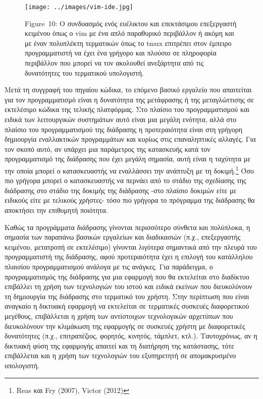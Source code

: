 \documentclass[
]{article}
\begin{document}
\leavevmode{}%
\begin{figure}
\hypertarget{fig:vim-ide}{%
\centering
\texttt{[image: ../images/vim-ide.jpg]}
\caption{Figure~10: Ο συνδυασμός ενός ευέλικτου και επεκτάσιμου
επεξεργαστή κειμένου όπως ο vim με ένα απλό παραθυρικό περιβάλλον ή
ακόμη και με έναν πολυπλέκτη τερματικών όπως το tmux επιτρέπει στον
έμπειρο προγραμματιστή να έχει ένα γρήγορο και πλούσιο σε πληροφορία
περιβάλλον που μπορεί να τον ακολουθεί ανεξάρτητα από τις δυνατότητες
του τερματικού υπολογιστή.}\label{fig:vim-ide}
}
\end{figure}

Μετά τη συγγραφή του πηγαίου κώδικα, το επόμενο βασικό εργαλείο που
απαιτείται για τον προγραμματισμό είναι η δυνατότητα της μετάφρασης ή
της μεταγλώττισης σε εκτελέσιμο κώδικα της τελικής πλατφόρμας. Στο
πλαίσιο του προγραμματισμού και ειδικά των λειτουργικών συστημάτων αυτό
είναι μια μεγάλη ενότητα, αλλά στο πλαίσιο του προγραμματισμού της
διάδρασης η προτεραιότητα είναι στη γρήγορη δημιουργία εναλλακτικών
προγραμμάτων και κυρίως στις επαναληπτικές αλλαγές. Για τον σκοπό αυτό,
αν υπάρχει μια παράμετρος της κατασκευής κατά τον προγραμματισμό της
διάδρασης που έχει μεγάλη σημασία, αυτή είναι η ταχύτητα με την οποία
μπορεί ο κατασκευαστής να εναλλάσσει την ανάπτυξη με τη
δοκιμή.\footnote{Reas και Fry (2007), Victor (2012)} Όσο πιο γρήγορα
μπορεί ο κατασκευαστής να περνάει από το στάδιο της σχεδίασης της
διάδρασης στο στάδιο της δοκιμής της διάδρασης -στο πλαίσιο δοκιμών είτε
με ειδικούς είτε με τελικούς χρήστες- τόσο πιο γρήγορα το πρόγραμμα της
διάδρασης θα αποκτήσει την επιθυμητή ποιότητα.

Καθώς τα προγράμματα διάδρασης γίνονται περισσότερο σύνθετα και
πολύπλοκα, η σημασία των παραπάνω βασικών εργαλείων και διαδικασιών
(π.χ., επεξεργαστής κειμένου, μετατροπή σε εκτελέσιμο) γίνονται λιγότερα
σημαντικά από την πλευρά του προγραμματιστή της διάδρασης, αφού
προτεραιότητα έχει η επιλογή του κατάλληλου πλαισίου προγραμματισμού
ανάλογα με τις ανάγκες. Για παράδειγμα, ο προγραμματισμός της διάδρασης
για μια εφαρμογή που θα εκτελείται στο διαδίκτυο επιβάλλει τη χρήση των
τεχνολογιών του ιστού και ειδικά εκείνων που διευκολύνουν τη δημιουργία
της διάδρασης στο τερματικό του χρήστη. Στην περίπτωση που είναι
αναγκαίο η δικτυακή εφαρμογή να εκτελείται σε τερματικές συσκευές
διαφορετικού μεγέθους, επιβάλλεται η χρήση των αντίστοιχων τεχνολογικών
αρχετύπων που διευκολύνουν την κλιμάκωση της εφαρμογής σε συσκευές
χρήστη με διαφορετικές δυνατότητες (π.χ., επιτραπέζιος, φορητός,
κινητός, τάμπλετ, κτλ.). Ταυτοχρόνως, αν η δικτυακή φύση της εφαρμογής
απαιτεί και τη διατήρηση της κατάστασης, τότε επιβάλλεται και η χρήση
των τεχνολογιών του εξυπηρετητή σε απομακρυσμένο υπολογιστή.
\end{document}
